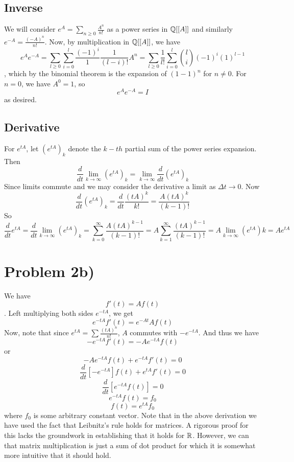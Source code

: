 \subsection*{Inverse}
We will consider $e^A=\sum_{n\geq0}\frac{A^n}{n!}$ as a power series in $\mathbb{Q}[[A]]$ and similarly $e^{-A}=\frac{(-A)^n}{n!}$. Now, by multiplication in $\mathbb{Q}[[A]]$, we have 
\[ e^Ae^{-A} = \sum_{l \geq 0}\sum_{i=0}^l \frac{(-1)^i}{1}\frac{1}{(l-i)!} A^n = \sum_{l \geq 0} \frac{1}{l!} \sum_{i=0}^l{l\choose i} (-1)^i(1)^{l-1}\], which by the binomial theorem is the expansion of $(1-1)^n$ for $n\neq 0$. For $n=0$, we have $A^0=1$, so
\[ e^Ae^{-A}=I \]
as desired.
\subsection*{Derivative}
For $e^{tA}$, let $(e^{tA})_k$ denote the $k-th$ partial sum of the power series expansion. Then
\[ \frac{d}{dt} \lim_{k\to \infty} (e^{tA})_k =  \lim_{k\to \infty} \frac{d}{dt} (e^{tA})_k \]
Since limits commute and we may consider the derivative a limit as $\Delta t \to 0$.
Now
\[ \frac{d}{dt} (e^{tA})_k = \frac{d}{dt} \frac{(tA)^k}{k!} = \frac{A(tA)^k}{(k-1)!} \]
So
\[ \frac{d}{dt} e^{tA} = \frac{d}{dt} \lim_{k\to \infty} (e^{tA})_k = \sum_{k=0}^{\infty} \frac{A(tA)^{k-1}}{(k-1)!}  = A\sum_{k=1}^{\infty} \frac{(tA)^{k-1}}{(k-1)!} = A \lim_{k\to\infty} (e^{tA})k = Ae^{tA} \]
\section*{Problem 2b)}
We have 
\[ f'(t) = Af(t) \].
Left multiplying both sides $e^{-tA}$, we get
\[ e^{-tA} f'(t) = e^{-At} A f(t) \]
Now, note that since $e^{tA} = \sum \frac{(tA)^n}{n!}$, $A$ commutes with $-e^{-tA}$. And thus we have
\[ -e^{-tA}f'(t) = -Ae^{-tA}f(t) \]
or 
\[ -Ae^{-tA}f(t) + e^{-tA}f'(t) = 0 \]
\[ \frac{d}{dt}\left[-e^{-tA}\right] f(t) + e^{tA}f'(t) = 0 \]
\[ \frac{d}{dt}\left[e^{-tA} f(t)\right] = 0\]
\[ e^{-tA} f(t) = f_0 \]
\[ f(t) = e^{tA} f_0 \]
where $f_0$ is some arbitrary constant vector. Note that in the above derivation we have used the fact that Leibnitz's rule holds for matrices. A rigorous proof for this lacks the groundwork in establishing that it holds for $\mathbb{R}$. However, we can that matrix multiplication is just a sum of dot product for which it is somewhat more intuitive that it should hold.

